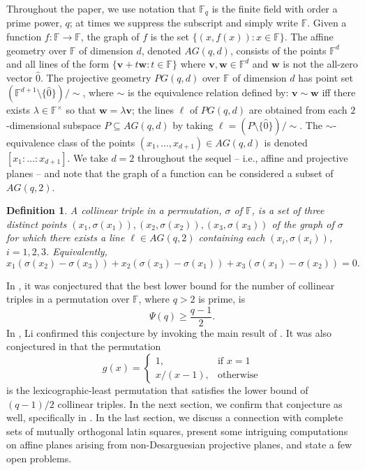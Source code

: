\documentclass[12pt]{article}
\newcommand{\F}{\mathbb{F}}
\newtheorem{definition}{Definition}
\begin{document}
Throughout the paper, we use notation that $\F_q$ is the finite field with order a prime power, $q$; at times we suppress the subscript and simply write $\F$. Given a function $f : \F \rightarrow \F$, the graph of $f$ is the set $\{(x,f(x)) : x \in \F\}$.  The affine geometry over $\F$ of dimension $d$, denoted $AG(q,d)$, consists of the points $\F^d$ and all lines of the form $\{\mathbf{v}+t\mathbf{w} : t \in \F\}$ where $\mathbf{v},\mathbf{w} \in \F^d$ and $\mathbf{w}$ is not the all-zero vector $\hat{0}$.  The projective geometry $PG(q,d)$ over $\F$ of dimension $d$ has point set $(\F^{d+1} \setminus \{\hat{0}\}) /\sim$, where $\sim$ is the equivalence relation defined by: $\mathbf{v} \sim \mathbf{w}$ iff there exists $\lambda \in \F^\times$ so that $\mathbf{w} = \lambda \mathbf{v}$; the lines $\ell$ of $PG(q,d)$ are obtained from each $2$-dimensional subspace $P \subseteq AG(q,d)$ by taking $\ell = (P \setminus \{\hat{0}\})/\sim$.  The $\sim$-equivalence class of the points $(x_1,\ldots,x_{d+1}) \in AG(q,d)$ is denoted $[x_1 : \ldots : x_{d+1}]$.  We take $d=2$ throughout the sequel -- i.e., affine and projective planes -- and note that the graph of a function can be considered a subset of $AG(q,2)$.


\begin{definition}
    A collinear triple in a permutation, $\sigma$ of $\F$, is a set of three distinct points $(x_1,\sigma(x_1)),(x_2,\sigma(x_2)),(x_3,\sigma(x_3))$ of the graph of $\sigma$ for which there exists a line $\ell \in AG(q,2)$ containing each $(x_i,\sigma(x_i))$, $i=1,2,3$.  Equivalently,
    \[
    x_1(\sigma(x_2)-\sigma(x_3))+x_2(\sigma(x_3)-\sigma(x_1)) + x_3(\sigma(x_1)-\sigma(x_2))=0.
    \]
\end{definition}

In \cite{cooper}, it was conjectured that the best lower bound for the number of collinear triples in a permutation over $\F$, where $q>2$ is prime, is
\begin{equation}\label{triples}
    \Psi(q) \geq \frac{q-1}{2}.
\end{equation}
In \cite{li}, Li confirmed this conjecture by invoking the main result of \cite{blokhuis}. It was also conjectured in \cite{cooper} that the permutation 
\[
g(x)=\begin{cases}
		1, & \text{if $x=1$}\\
            x/(x-1), & \text{otherwise}
		 \end{cases}
\]
is the lexicographic-least permutation that satisfies the lower bound of $(q-1)/2$ collinear triples. In the next section, we confirm that conjecture as well, specifically in .  In the last section, we discuss a connection with complete sets of mutually orthogonal latin squares, present some intriguing computations on affine planes arising from non-Desarguesian projective planes, and state a few open problems.
\end{document}
